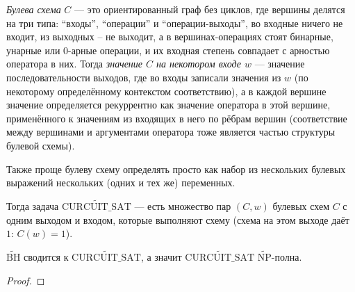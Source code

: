 \documentclass[12pt,a4paper]{article}
\newcommand{\NPtilde}{\widetilde{\mathrm{NP}}}
\newcommand{\BHtilde}{\widetilde{\mathrm{BH}}}
\newcommand{\CURCUITSATtilde}{\widetilde{\mathrm{CURCUIT\_SAT}}}
\begin{document}
    \begin{definition}
        \emph{Булева схема} $C$ --- это ориентированный граф без циклов, где вершины делятся на три типа: ``входы'', ``операции'' и ``операции-выходы'', во входные ничего не входит, из выходных -- не выходит, а в вершинах-операциях стоят бинарные, унарные или 0-арные операции, и их входная степень совпадает с арностью оператора в них. Тогда \emph{значение $C$ на некотором входе $w$} --- значение последовательности выходов, где во входы записали значения из $w$ (по некоторому определённому контекстом соответствию), а в каждой вершине значение определяется рекуррентно как значение оператора в этой вершине, применённого к значениям из входящих в него по рёбрам вершин (соответствие между вершинами и аргументами оператора тоже является частью структуры булевой схемы).

        Также проще булеву схему определять просто как набор из нескольких булевых выражений нескольких (одних и тех же) переменных.

        Тогда задача $\CURCUITSATtilde$ --- есть множество пар $(C, w)$ булевых схем $C$ с одним выходом и входом, которые выполняют схему (схема на этом выходе даёт $1$: $C(w) = 1$).
    \end{definition}

    \begin{theorem}
        $\BHtilde$ сводится к $\CURCUITSATtilde$, а значит $\CURCUITSATtilde$ $\NPtilde$-полна.
    \end{theorem}

    \begin{proof}
        
    \end{proof}

\end{document}
